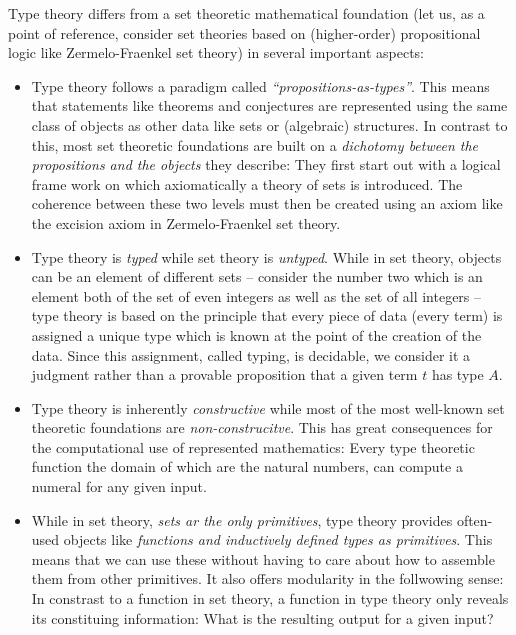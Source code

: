 Type theory differs from a set theoretic mathematical foundation (let us, as a
point of reference, consider set theories based on (higher-order) propositional logic
like Zermelo-Fraenkel set theory) in several
important aspects:
\begin{itemize}
\item Type theory follows a paradigm called \emph{``propositions-as-types''}.
This means that statements like theorems and conjectures are represented
using the same class of objects as other data like sets or (algebraic) structures.
In contrast to this, most set theoretic foundations are built on a \emph{dichotomy between
the propositions and the objects} they describe:
They first start out with a logical frame work on which axiomatically a theory
of sets is introduced.
The coherence between these two levels must then be created using an axiom like
the excision axiom in Zermelo-Fraenkel set theory.
\item Type theory is \emph{typed} while set theory is \emph{untyped}.
While in set theory, objects can be an element of different sets --
consider the number two which is an element both of the set of even integers
as well as the set of all integers --
type theory is based on the principle that every piece of data (every term)
is assigned a unique type which is known at the point of the creation of the data.
Since this assignment, called typing, is decidable, we consider it a judgment
rather than a provable proposition that a given term $t$ has type $A$.
\item Type theory is inherently \emph{constructive} while most of the most
well-known set theoretic foundations are \emph{non-construcitve}.
This has great consequences for the computational use of represented mathematics:
Every type theoretic function the domain of which are the natural numbers, can compute a
numeral for any given input.
\item While in set theory, \emph{sets ar the only primitives}, type theory
provides often-used objects like \emph{functions and inductively defined types
as primitives}.
This means that we can use these without having to care about how to assemble them
from other primitives. 
It also offers modularity in the follwowing sense: %
In constrast to a function in set theory, a function in type theory only reveals
its constituing information:
What is the resulting output for a given input?
\end{itemize} %

